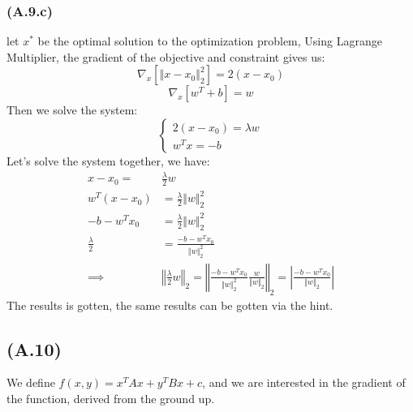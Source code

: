 \documentclass[]{article}
\begin{document}
        \subsubsection*{(A.9.c)}
            let $x^*$ be the optimal solution to the optimization problem, Using Lagrange Multiplier, the gradient of the objective and constraint gives us: 
            \begin{equation*}\tag{2.9.c.1}\label{eqn:2.9.c.1}
                \nabla_x[\left\Vert
                     x - x_0
                \right\Vert_2^2] = 2(x - x_0)
            \end{equation*}
            \begin{equation*}\tag{2.9.c.2}\label{eqn:2.9.c.2}
                \nabla_x[w^T + b] = w
            \end{equation*}
            Then we solve the system: 
            \begin{equation*}\tag{2.9.c.3}\label{eqn:2.9.c.3}
                \begin{cases}
                    2(x - x_0) = \lambda w
                    \\
                    w^Tx = -b
                \end{cases}
            \end{equation*}
            Let's solve the system together, we have: 
            \begin{align*}\tag{2.9.c.4}\label{eqn:2.9.c.4}
                x - x_0 =& \frac{\lambda}{2}w
                \\
                w^T(x - x_0) &= \frac{\lambda}{2}\Vert w\Vert_2^2
                \\
                -b - w^Tx_0 &= \frac{\lambda}{2}\Vert w\Vert_2^2
                \\
                \frac{\lambda}{2} &= \frac{-b - w^Tx_0}{\Vert w\Vert_2^2}
                \\
                \implies &
                \left\Vert
                     \frac{\lambda}{2} w
                \right\Vert_2
                = 
                \left\Vert
                    \frac{-b - w^Tx_0}{\Vert w\Vert_2^2} \frac{w}{\Vert w\Vert_2}
                \right\Vert_2
                =
                \left\vert
                     \frac{-b - w^Tx_0}{\Vert w\Vert_2}
                \right\vert
            \end{align*}
            The results is gotten, the same results can be gotten via the hint. 
    \subsection*{(A.10)}
        We define $f(x, y) = x^TAx + y^TBx + c$, and we are interested in the gradient of the function, derived from the ground up. 
\end{document}
